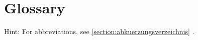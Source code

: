 %
%
\clearpage
\section{Glossary}\label{section:glossar}
Hint: For abbreviations, see \ref{section:abkuerzungsverzeichnis} .


